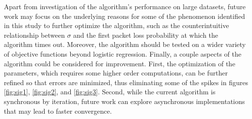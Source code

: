 \documentclass[conference]{IEEEtran}
\begin{document}
Apart from investigation of the algorithm's performance on large datasets, future work may focus on the underlying reasons for some of the 
phenomenon identified in this study to further optimize the algorithm, such as the counterintuitive relationship between $\sigma$ and the first packet loss probability at which the algorithm times out.
Moreover, the algorithm should be tested on a wider variety of objective functions beyond logistic regression. Finally, a couple aspects of the 
algorithm could be considered for improvement. First, the optimization of the parameters, which requires some higher order computations, can be further refined so that
errors are minimized, thus eliminating some of the spikes in figures \ref{fig:sig1}, \ref{fig:sig2}, and \ref{fig:sig3}. Second, while the current algorithm is 
 synchronous by iteration, future work can explore asynchronous implementations that may lead to faster convergence. 
\printbibliography
\end{document}
